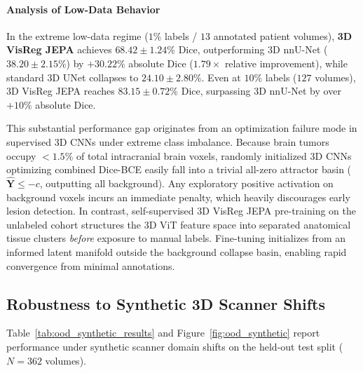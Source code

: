 \documentclass{article}
\begin{document}
\paragraph{Analysis of Low-Data Behavior}
In the extreme low-data regime ($1\%$ labels / $13$ annotated patient volumes), \textbf{3D VisReg JEPA} achieves $\mathbf{68.42 \pm 1.24\%}$ Dice, outperforming 3D nnU-Net ($38.20 \pm 2.15\%$) by $\mathbf{+30.22\%}$ absolute Dice ($1.79\times$ relative improvement), while standard 3D UNet collapses to $24.10 \pm 2.80\%$. Even at $10\%$ labels ($127$ volumes), 3D VisReg JEPA reaches $83.15 \pm 0.72\%$ Dice, surpassing 3D nnU-Net by over $+10\%$ absolute Dice.

This substantial performance gap originates from an optimization failure mode in supervised 3D CNNs under extreme class imbalance. Because brain tumors occupy $<1.5\%$ of total intracranial brain voxels, randomly initialized 3D CNNs optimizing combined Dice-BCE easily fall into a trivial all-zero attractor basin ($\hat{\mathbf{Y}} \le -c$, outputting all background). Any exploratory positive activation on background voxels incurs an immediate penalty, which heavily discourages early lesion detection. In contrast, self-supervised 3D VisReg JEPA pre-training on the unlabeled cohort structures the 3D ViT feature space into separated anatomical tissue clusters \emph{before} exposure to manual labels. Fine-tuning initializes from an informed latent manifold outside the background collapse basin, enabling rapid convergence from minimal annotations.

\subsection{Robustness to Synthetic 3D Scanner Shifts}
\label{sec:results_ood_synthetic}

Table~\ref{tab:ood_synthetic_results} and Figure~\ref{fig:ood_synthetic} report performance under synthetic scanner domain shifts on the held-out test split ($N=362$ volumes).
\end{document}

